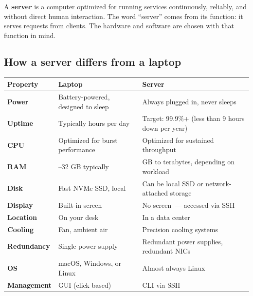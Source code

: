A \textbf{server} is a computer optimized for running services continuously, reliably, and without direct human interaction. The word ``server'' comes from its function: it serves requests from clients. The hardware and software are chosen with that function in mind.


\subsection*{How a server differs from a laptop}\label{20-server-fundamentals:how-a-server-differs-from-a-laptop}

{\def\LTcaptype{none} %
\begin{longtable}[]{@{}
  >{\raggedright\arraybackslash}p{}
  >{\raggedright\arraybackslash}p{}
  >{\raggedright\arraybackslash}p{}@{}}
\toprule\noalign{}
\begin{minipage}[b]{\linewidth}\raggedright
Property
\end{minipage} & \begin{minipage}[b]{\linewidth}\raggedright
Laptop
\end{minipage} & \begin{minipage}[b]{\linewidth}\raggedright
Server
\end{minipage} \\
\midrule\noalign{}
\endhead
\bottomrule\noalign{}
\endlastfoot
\textbf{Power} & Battery-powered, designed to sleep & Always plugged in, never sleeps \\
\textbf{Uptime} & Typically hours per day & Target: 99.9\%+ (less than 9 hours down per year) \\
\textbf{CPU} & Optimized for burst performance & Optimized for sustained throughput \\
\textbf{RAM} & 8--32 GB typically & 1 GB to terabytes, depending on workload \\
\textbf{Disk} & Fast NVMe SSD, local & Can be local SSD or network-attached storage \\
\textbf{Display} & Built-in screen & No screen~--- accessed via SSH \\
\textbf{Location} & On your desk & In a data center \\
\textbf{Cooling} & Fan, ambient air & Precision cooling systems \\
\textbf{Redundancy} & Single power supply & Redundant power supplies, redundant NICs \\
\textbf{OS} & macOS, Windows, or Linux & Almost always Linux \\
\textbf{Management} & GUI (click-based) & CLI via SSH \\
\end{longtable}
}

